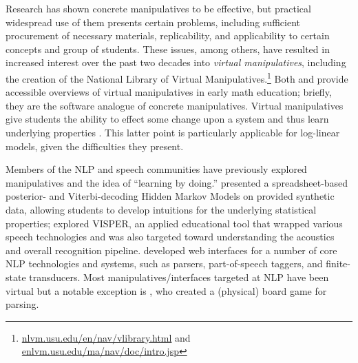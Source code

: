 \documentclass[11pt,letterpaper]{article}
\newcommand{\Note}[1]{}
\renewcommand{\Note}[1]{\hl{[#1]}}  %
\newcommand{\NoteSigned}[3]{{\sethlcolor{#2}\Note{#1: #3}}}
\newcommand{\NoteFF}[1]{\NoteSigned{FF}{LightBlue}{#1}}
\newcommand{\NoteJE}[1]{\NoteSigned{JE}{LightGreen}{#1}}
\newcommand{\Commented}[1]{#1}
\begin{document}
Research has shown concrete manipulatives to be effective, but practical widespread use of them presents certain 
problems, including sufficient procurement of necessary materials, replicability,
and applicability to certain concepts and group of students. These issues, among others, have 
resulted in increased interest over the past two decades into \textit{virtual manipulatives}, including the creation of 
the National Library of Virtual Manipulatives.\footnote{\url{nlvm.usu.edu/en/nav/vlibrary.html} and 
\url{enlvm.usu.edu/ma/nav/doc/intro.jsp}} 
Both  and  provide accessible overviews of 
virtual manipulatives in early math education; briefly, they are the software analogue of concrete manipulatives. 
Virtual manipulatives give students the ability to effect some change upon a system and thus learn underlying 
properties \cite{moyer2002virtual}. This latter point is particularly applicable for log-linear models, given the 
difficulties they present.



Members of the NLP and speech communities have previously explored manipulatives and the idea of
``learning by doing.''
 presented a spreadsheet-based posterior- and Viterbi-decoding Hidden Markov Models 
on provided synthetic data, allowing students to develop intuitions for the underlying statistical properties; 
 explored VISPER, an applied educational tool that wrapped various speech technologies and 
was also targeted toward understanding the acoustics and overall recognition pipeline. 
 developed web interfaces for a number of core NLP technologies and systems, such as parsers, part-of-speech 
taggers, and finite-state transducers. 
Most manipulatives/interfaces targeted at NLP have been virtual but a notable exception is , 
who created a (physical) board game for parsing. 
\end{document}
